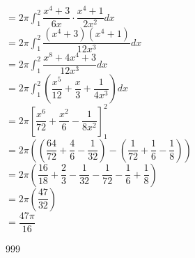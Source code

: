 \documentclass[a4paper]{article}
\begin{document}
$=2\pi \displaystyle\int_1^2 \dfrac{x^4+3}{6x}\cdot\dfrac{x^4+1}{2x^2} dx$\\

$=2\pi \displaystyle\int_1^2 \dfrac{(x^4+3)(x^4+1)}{12x^3} dx$\\

$=2\pi \displaystyle\int_1^2 \dfrac{x^8+4x^4+3}{12x^3} dx$\\

$=2\pi \displaystyle\int_1^2 \left(\dfrac{x^5}{12}+\dfrac{x}{3}+\dfrac{1}{4x^3}\right) dx$\\

$=2\pi \left[\dfrac{x^6}{72}+\dfrac{x^2}{6}-\dfrac{1}{8x^2}\right]_1^2$\\

$=2\pi \left(\left(\dfrac{64}{72}+\dfrac{4}{6}-\dfrac{1}{32}\right)-\left(\dfrac{1}{72}+\dfrac{1}{6}-\dfrac{1}{8}\right)\right)$\\

$=2\pi \left(\dfrac{16}{18}+\dfrac{2}{3}-\dfrac{1}{32}-\dfrac{1}{72}-\dfrac{1}{6}+\dfrac{1}{8}\right)$\\

$=2\pi \left(\dfrac{47}{32}\right)$\\

$=\dfrac{47\pi}{16}$\\

\begin{thebibliography}{999}
\end{thebibliography}
\end{document}
